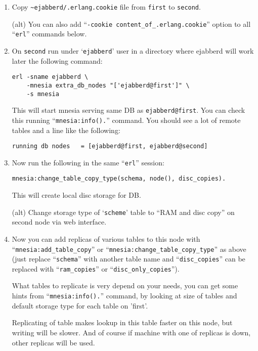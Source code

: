 \documentclass[a4paper,10pt]{article}
\newcommand{\node}[1]{\texttt{#1}}
\newcommand{\term}[1]{\texttt{#1}}
\newcommand{\shell}[1]{\texttt{#1}}
\begin{document}
\begin{enumerate}
\item Copy \verb|~ejabberd/.erlang.cookie| file from \term{first} to
  \term{second}.
  
  (alt) You can also add ``\verb|-cookie content_of_.erlang.cookie|''
  option to all ``\shell{erl}'' commands below.
  
\item On \term{second} run under `\term{ejabberd}' user in a directory
  where ejabberd will work later the following command:

\begin{verbatim}
erl -sname ejabberd \
    -mnesia extra_db_nodes "['ejabberd@first']" \
    -s mnesia
\end{verbatim}
  
  This will start mnesia serving same DB as \node{ejabberd@first}.
  You can check this running ``\verb|mnesia:info().|'' command.  You
  should see a lot of remote tables and a line like the following:

\begin{verbatim}
running db nodes   = [ejabberd@first, ejabberd@second]
\end{verbatim}

  
\item Now run the following in the same ``\shell{erl}'' session:

\begin{verbatim}
mnesia:change_table_copy_type(schema, node(), disc_copies).
\end{verbatim}

  This will create local disc storage for DB.
  
  (alt) Change storage type of `\term{scheme}' table to ``RAM and disc
  copy'' on second node via web interface.

  
\item Now you can add replicas of various tables to this node with
  ``\verb|mnesia:add_table_copy|'' or
  ``\verb|mnesia:change_table_copy_type|'' as above (just replace
  ``\verb|schema|'' with another table name and ``\verb|disc_copies|''
  can be replaced with ``\verb|ram_copies|'' or
  ``\verb|disc_only_copies|'').
  
  What tables to replicate is very depend on your needs, you can get
  some hints from ``\verb|mnesia:info().|'' command, by looking at
  size of tables and default storage type for each table on 'first'.
  
  Replicating of table makes lookup in this table faster on this node,
  but writing will be slower.  And of course if machine with one of
  replicas is down, other replicas will be used.
  

\end{enumerate}
\end{document}
